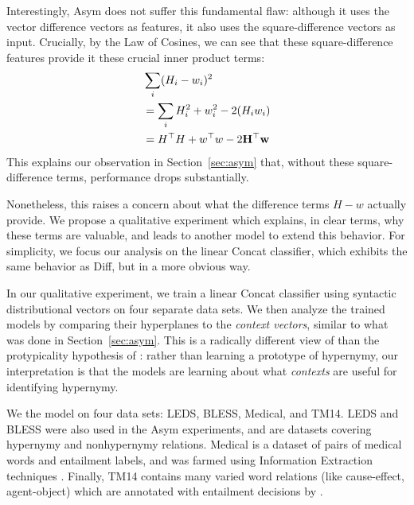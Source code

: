\documentclass[12pt]{article}
\begin{document}
Interestingly, Asym does not suffer this fundamental flaw: although it uses
the vector difference vectors as features, it also uses the square-difference
vectors as input. Crucially, by the Law of Cosines, we can see that these
square-difference features provide it these crucial inner product terms:
\begin{align*}
  & \sum_i (H_i - w_i)^2\\
  & = \sum_i H_i^2 + w_i^2 - 2({H}_i{w}_i)\\
  & = H^\top H + w^\top w - 2{\bf H^\top{w}}
\end{align*}
This explains our observation in Section~\ref{sec:asym} that, without these
square-difference terms, performance drops substantially.

Nonetheless, this raises a concern about what the difference terms $H - w$
actually provide. We propose a qualitative experiment which explains, in
clear terms, why these terms are valuable, and leads to another model to
extend this behavior. For simplicity, we focus our analysis on the linear
Concat classifier, which exhibits the same behavior as Diff, but in a
more obvious way.

In our qualitative experiment, we train a linear Concat classifier using
syntactic distributional vectors on four separate data sets. We then analyze
the trained models by comparing their hyperplanes to the {\em context vectors},
similar to what was done in Section~\ref{sec:asym}. This is a radically
different view of than the protypicality hypothesis of
: rather than learning a prototype of hypernymy, our
interpretation is that the models are learning about what {\em contexts} are
useful for identifying hypernymy.

We the model on four data sets: LEDS, BLESS, Medical, and TM14. LEDS and BLESS
were also used in the Asym experiments, and are datasets covering hypernymy and
nonhypernymy relations. Medical is a dataset of pairs of medical words and
entailment labels, and was farmed using Information Extraction techniques
\cite{levy:2014:conll}. Finally, TM14 contains many varied word relations (like
cause-effect, agent-object) which are annotated with entailment decisions by
.
\end{document}
